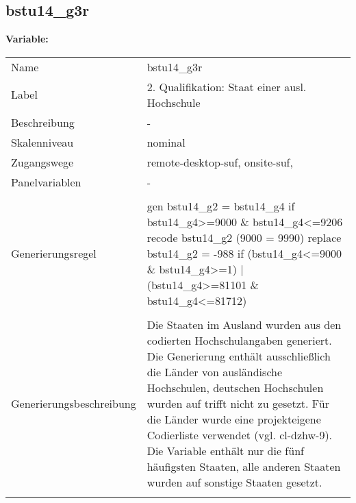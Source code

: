 	
	
	\subsection{bstu14\_g3r}
	\label{subSection:bstu14_g3r}

	\noindent\textbf{Variable:}\\
		\begin{tabular}{lL{11.3cm}}
			\label{tableVariable:bstu14_g3r}
			Name & bstu14\_g3r \\
			Label & 2. Qualifikation: Staat einer ausl. Hochschule \\
			Beschreibung & - \\
			Skalenniveau & nominal \\
			Zugangswege &
				remote-desktop-suf,
				onsite-suf,
 \\
			Panelvariablen & -
			 \\
			 \\
					Generierungsregel & gen bstu14\_g2 = bstu14\_g4 if bstu14\_g4\textgreater{}=9000 \& bstu14\_g4\textless{}=9206
recode bstu14\_g2 (9000 = 9990)
replace bstu14\_g2 = -988 if (bstu14\_g4\textless{}=9000 \& bstu14\_g4\textgreater{}=1) | (bstu14\_g4\textgreater{}=81101 \& bstu14\_g4\textless{}=81712) \\
				 \\
					Generierungsbeschreibung & Die Staaten im Ausland wurden aus den codierten Hochschulangaben generiert. Die Generierung enthält ausschließlich die Länder von ausländische Hochschulen, deutschen Hochschulen wurden auf trifft nicht zu gesetzt. Für die Länder wurde eine projekteigene Codierliste verwendet (vgl. cl-dzhw-9). Die Variable enthält nur die fünf häufigsten Staaten, alle anderen Staaten wurden auf sonstige Staaten gesetzt. 
				 \\	
			 \\
		\end{tabular}






